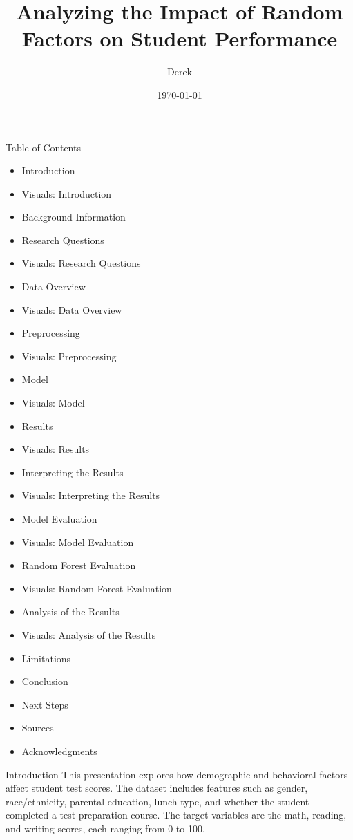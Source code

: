 \documentclass{beamer}
\title{Analyzing the Impact of Random Factors on Student Performance}
\author{Derek}
\institute{}
\date{\today}
\begin{document}
\begin{frame}
  \titlepage
\end{frame}

\begin{frame}{Table of Contents}
  \begin{multicols}{2}
    \begin{itemize}
        \item Introduction
        \item Visuals: Introduction
        \item Background Information
        \item Research Questions
        \item Visuals: Research Questions
        \item Data Overview
        \item Visuals: Data Overview
        \item Preprocessing
        \item Visuals: Preprocessing
        \item Model
        \item Visuals: Model
        \item Results
        \item Visuals: Results
        \item Interpreting the Results
        \item Visuals: Interpreting the Results
        \item Model Evaluation
        \item Visuals: Model Evaluation
        \item Random Forest Evaluation
        \item Visuals: Random Forest Evaluation
        \item Analysis of the Results
        \item Visuals: Analysis of the Results
        \item Limitations
        \item Conclusion
        \item Next Steps
        \item Sources
        \item Acknowledgments
    \end{itemize}
  \end{multicols}
\end{frame}

\begin{frame}{Introduction}
  This presentation explores how demographic and behavioral factors affect student test scores. The dataset includes features such as gender, race/ethnicity, parental education, lunch type, and whether the student completed a test preparation course. The target variables are the math, reading, and writing scores, each ranging from 0 to 100.
\end{frame}
\end{document}
